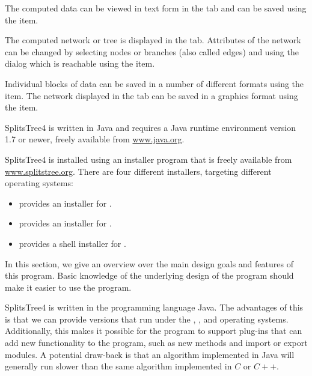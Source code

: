 \documentclass[11pt]{article}
\def\SplitsTree{{\sf SplitsTree4 }}
\begin{document}
The computed data can be viewed in text form in the 
tab and can be saved using the  item.

The computed network or tree is displayed in the 
tab. Attributes of the network can be changed by selecting nodes or branches
(also called edges)
and using the  dialog which is reachable using
the  item.

Individual blocks of data can be saved in a number of different
formats using the  item.
The network displayed in the  tab can
be saved in a graphics format using the 
item.


\SplitsTree is written in Java and requires a Java runtime environment
version 1.7 or newer, freely available from \href{http://www.java.org}{www.java.org}.

\SplitsTree is installed using an installer program that is freely available
from \href{http://www.splitstree.org}{www.splitstree.org}.
There are four different installers, targeting different operating systems:
\begin{itemize}
\item {} provides an installer for .
\item {} provides an installer for .
\item {} provides a shell installer for .
\end{itemize}


In this section, we give an overview over the main design goals
and features of this program. Basic knowledge of the underlying design of
the program should make it easier to use the program.

\SplitsTree is written in the programming language Java.
The advantages of this is that we can provide versions that run under the
, ,  and  operating systems.
Additionally, this makes it possible for the program to support plug-ins
that can add new functionality to the program, such as new methods
and import or export modules.
A potential draw-back is that an algorithm implemented in Java will generally
run slower than the same algorithm implemented in $C$ or $C{+}{+}$.
\end{document}
